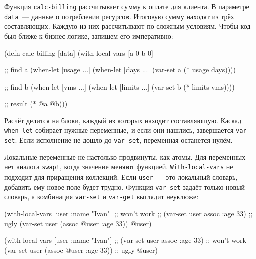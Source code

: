 Функция \verb|calc-billing| рассчитывает сумму к оплате для клиента. В параметре
\verb|data|~--- данные о потреблении ресурсов. Итоговую сумму находят из трёх
составляющих. Каждую из них рассчитывают по сложным условиям. Чтобы код был
ближе к бизнес-логике, запишем его императивно:

\begin{english}
  \begin{clojure}
(defn calc-billing [data]
  (with-local-vars
    [a 0 b 0]

    ;; find a
    (when-let [usage ...]
      (when-let [days ...]
        (var-set a (* usage days))))

    ;; find b
    (when-let [vms ...]
      (when-let [limits ...]
        (var-set b (* limits vms))))

    ;; result
    (* @a @b)))
  \end{clojure}
\end{english}

Расчёт делится на блоки, каждый из которых находит составляющую. Каскад
\verb|when-let| собирает нужные переменные, и если они нашлись, завершается
\verb|var-set|. Если исполнение не дошло до \verb|var-set|, переменная останется
нулём.

Локальные переменные не настолько продвинуты, как атомы. Для переменных нет
аналога \verb|swap!|, когда значение меняют функцией. \verb|With-local-vars| не
подходит для приращения коллекций. Если \verb|user|~--- это локальный словарь,
добавить ему новое поле будет трудно. Функция \verb|var-set| задаёт только новый
словарь, а комбинация \verb|var-set| и \verb|var-get| выглядит неуклюже:

\ifnarrow

\begin{english}
  \begin{clojure}
(with-local-vars [user {:name "Ivan"}]
  ;; won't work
  ;; (var-set user assoc :age 33)
  ;; ugly
  (var-set user (assoc @user :age 33))
  @user)
  \end{clojure}
\end{english}

\else

\begin{english}
  \begin{clojure}
(with-local-vars [user {:name "Ivan"}]
  ;; (var-set user assoc :age 33) ;; won't work
  (var-set user (assoc @user :age 33)) ;; ugly
  @user)
  \end{clojure}
\end{english}

